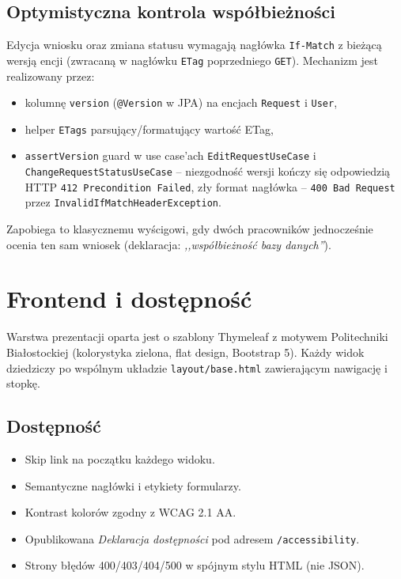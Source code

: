 \documentclass[12pt,a4paper]{article}
\begin{document}
\subsection{Optymistyczna kontrola współbieżności}
Edycja wniosku oraz zmiana statusu wymagają nagłówka
\texttt{If-Match} z bieżącą wersją encji (zwracaną w nagłówku \texttt{ETag}
poprzedniego \texttt{GET}). Mechanizm jest realizowany przez:
\begin{itemize}[leftmargin=*]
  \item kolumnę \texttt{version} (\texttt{@Version} w JPA) na encjach
        \texttt{Request} i \texttt{User},
  \item helper \texttt{ETags} parsujący/formatujący wartość ETag,
  \item \texttt{assertVersion} guard w use case'ach \texttt{EditRequestUseCase}
        i \texttt{ChangeRequestStatusUseCase} -- niezgodność wersji kończy
        się odpowiedzią HTTP \texttt{412 Precondition Failed}, zły format
        nagłówka -- \texttt{400 Bad Request} przez
        \texttt{InvalidIfMatchHeaderException}.
\end{itemize}
Zapobiega to klasycznemu wyścigowi, gdy dwóch pracowników jednocześnie ocenia
ten sam wniosek (deklaracja: \emph{,,współbieżność bazy danych''}).

\section{Frontend i dostępność}
\label{sec:front}

Warstwa prezentacji oparta jest o szablony Thymeleaf z motywem Politechniki
Białostockiej (kolorystyka zielona, flat design, Bootstrap 5). Każdy widok
dziedziczy po wspólnym układzie \texttt{layout/base.html} zawierającym nawigację
i stopkę.

\subsection{Dostępność}
\begin{itemize}[leftmargin=*]
  \item Skip link na początku każdego widoku.
  \item Semantyczne nagłówki i etykiety formularzy.
  \item Kontrast kolorów zgodny z WCAG 2.1 AA.
  \item Opublikowana \emph{Deklaracja dostępności} pod adresem \texttt{/accessibility}.
  \item Strony błędów 400/403/404/500 w spójnym stylu HTML (nie JSON).
\end{itemize}
\end{document}
